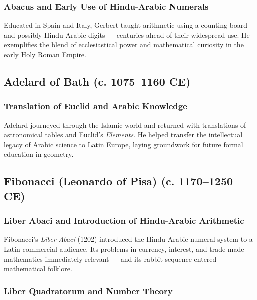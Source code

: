 \documentclass[9pt]{article}
\begin{document}
\subsubsection*{Abacus and Early Use of Hindu-Arabic Numerals}

Educated in Spain and Italy, Gerbert taught arithmetic using a counting board and possibly Hindu-Arabic digits — centuries ahead of their widespread use.  
He exemplifies the blend of ecclesiastical power and mathematical curiosity in the early Holy Roman Empire.

\vspace{0.5em}

\subsection*{Adelard of Bath (c. 1075–1160 CE)}

\subsubsection*{Translation of Euclid and Arabic Knowledge}

Adelard journeyed through the Islamic world and returned with translations of astronomical tables and Euclid’s \textit{Elements}.  
He helped transfer the intellectual legacy of Arabic science to Latin Europe, laying groundwork for future formal education in geometry.

\vspace{0.5em}

\subsection*{Fibonacci (Leonardo of Pisa) (c. 1170–1250 CE)}

\subsubsection*{Liber Abaci and Introduction of Hindu-Arabic Arithmetic}

Fibonacci’s \textit{Liber Abaci} (1202) introduced the Hindu-Arabic numeral system to a Latin commercial audience.  
Its problems in currency, interest, and trade made mathematics immediately relevant — and its rabbit sequence entered mathematical folklore.

\subsubsection*{Liber Quadratorum and Number Theory}
\end{document}

